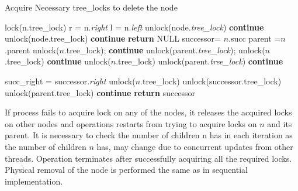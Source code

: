 \documentclass[MTech]{iitmdiss}
\begin{document}
\begin{algorithm}
\caption{Acquire Necessary tree\_locks to delete the node}
\begin{algorithmic}[1]
    \State lock(n.tree\_lock)
    \State r = n.\textit{right}
    \State l = n.\textit{left}
            \State unlock(node.\textit{tree\_lock})
            \State \textbf{continue}
            \State unlock(node.tree\_lock)
            \State \textbf{continue}
        \EndIf
        \State \textbf{return} NULL
    \EndIf
    \State successor= $n$.succ
    \State parent =$n$.parent
            \State unlock($n$.tree\_lock);
            \State \textbf{continue}
            \State unlock(parent.\textit{tree\_lock});
            \State unlock($n$.tree\_lock)
            \State \textbf{continue}
        \EndIf
    \EndIf
        \State unlock($n$.tree\_lock)
            \State unlock(parent.\textit{tree\_lock})
        \EndIf
        \State \textbf{continue}
    \EndIf
    
    \State succ\_right = successor.\textit{right}
        \State unlock($n$.tree\_lock)
        \State unlock(successor.tree\_lock)
            \State unlock(parent.tree\_lock)
        \EndIf
        \State \textbf{continue}
    \EndIf
    \State \textbf{return} successor
\EndWhile
\EndFunction
\end{algorithmic}
\end{algorithm}

If process fails to acquire lock on any of the nodes, it releases the acquired locks on other nodes and operations restarts from trying to acquire locks on $n$ and its parent. It is necessary to check the number of children n has in each iteration as the number of children $n$ has, may change due to concurrent updates from other threads. Operation terminates after successfully acquiring all the required locks. Physical removal of the node is performed the same as in sequential implementation.  
\end{document}
